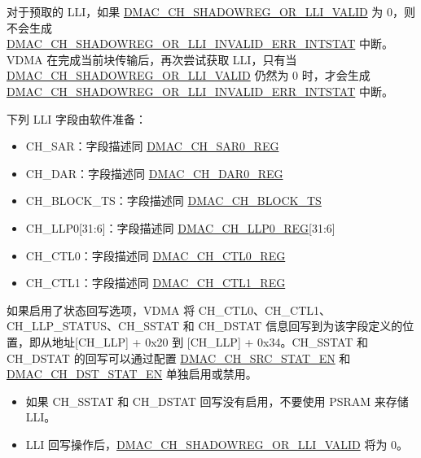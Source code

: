\documentclass[main\_\_CN.tex]{subfiles}
\begin{document}
\begin{tiplisting}
    对于预取的 LLI，如果 \hyperref[fielddesc:DMACCHNSHADOWREGORLLIVALID]{DMAC\_CH\_SHADOWREG\_OR\_LLI\_VALID} 为 0，则不会生成\\ \hyperref[fielddesc:DMACCHNSHADOWREGORLLIINVALIDERRINTSTAT]{DMAC\_CH\_SHADOWREG\_OR\_LLI\_INVALID\_ERR\_INTSTAT} 中断。VDMA 在完成当前块传输后，再次尝试获取 LLI，只有当 \hyperref[fielddesc:DMACCHNSHADOWREGORLLIVALID]{DMAC\_CH\_SHADOWREG\_OR\_LLI\_VALID} 仍然为 0 时，才会生成\\ \hyperref[fielddesc:DMACCHNSHADOWREGORLLIINVALIDERRINTSTAT]{DMAC\_CH\_SHADOWREG\_OR\_LLI\_INVALID\_ERR\_INTSTAT} 中断。
\end{tiplisting}

下列 LLI 字段由软件准备：

\begin{itemize}
    \item CH\_SAR：字段描述同 \hyperref[regdesc:DMACCHNSAR0REG]{DMAC\_CH\_SAR0\_REG}
    \item CH\_DAR：字段描述同 \hyperref[regdesc:DMACCHNDAR0REG]{DMAC\_CH\_DAR0\_REG}
    \item CH\_BLOCK\_TS：字段描述同 \hyperref[fielddesc:DMACCHNBLOCKTS]{DMAC\_CH\_BLOCK\_TS}
    \item CH\_LLP0[31:6]：字段描述同 \hyperref[regdesc:DMACCHNLLP0REG]{DMAC\_CH\_LLP0\_REG}[31:6]
    \item CH\_CTL0：字段描述同 \hyperref[regdesc:DMACCHNCTL0REG]{DMAC\_CH\_CTL0\_REG}
    \item CH\_CTL1：字段描述同 \hyperref[regdesc:DMACCHNCTL1REG]{DMAC\_CH\_CTL1\_REG}
\end{itemize}

如果启用了状态回写选项，VDMA 将 CH\_CTL0、CH\_CTL1、CH\_LLP\_STATUS、CH\_SSTAT 和 CH\_DSTAT 信息回写到为该字段定义的位置，即从地址[CH\_LLP] + 0x20 到 [CH\_LLP] + 0x34。CH\_SSTAT 和 CH\_DSTAT 的回写可以通过配置 \hyperref[fielddesc:DMACCHNSRCSTATEN]{DMAC\_CH\_SRC\_STAT\_EN} 和 \hyperref[fielddesc:DMACCHNDSTSTATEN]{DMAC\_CH\_DST\_STAT\_EN} 单独启用或禁用。

\begin{tiplisting}
\vspace{-2em}
\begin{itemize}
    \item 如果 CH\_SSTAT 和 CH\_DSTAT 回写没有启用，不要使用 PSRAM 来存储 LLI。
    \item LLI 回写操作后，\hyperref[fielddesc:DMACCHNSHADOWREGORLLIVALID]{DMAC\_CH\_SHADOWREG\_OR\_LLI\_VALID} 将为 0。
\end{itemize}

\end{tiplisting}
\end{document}
